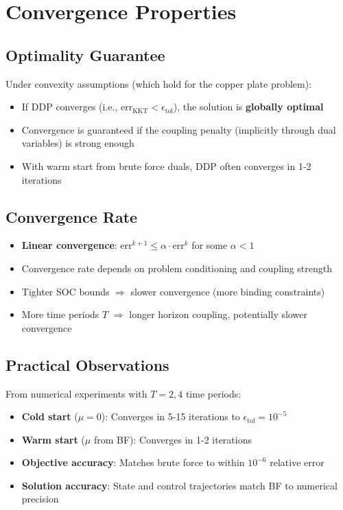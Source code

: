 \documentclass[11pt]{article}
\begin{document}
\section{Convergence Properties}

\subsection{Optimality Guarantee}
Under convexity assumptions (which hold for the copper plate problem):
\begin{itemize}
    \item If DDP converges (i.e., $\text{err}_{\text{KKT}} < \epsilon_{\text{tol}}$), the solution is \textbf{globally optimal}
    \item Convergence is guaranteed if the coupling penalty (implicitly through dual variables) is strong enough
    \item With warm start from brute force duals, DDP often converges in 1-2 iterations
\end{itemize}

\subsection{Convergence Rate}
\begin{itemize}
    \item \textbf{Linear convergence}: $\text{err}^{k+1} \leq \alpha \cdot \text{err}^k$ for some $\alpha < 1$
    \item Convergence rate depends on problem conditioning and coupling strength
    \item Tighter SOC bounds $\Rightarrow$ slower convergence (more binding constraints)
    \item More time periods $T$ $\Rightarrow$ longer horizon coupling, potentially slower convergence
\end{itemize}

\subsection{Practical Observations}
From numerical experiments with $T = 2, 4$ time periods:
\begin{itemize}
    \item \textbf{Cold start} ($\mu = 0$): Converges in 5-15 iterations to $\epsilon_{\text{tol}} = 10^{-5}$
    \item \textbf{Warm start} ($\mu$ from BF): Converges in 1-2 iterations
    \item \textbf{Objective accuracy}: Matches brute force to within $10^{-6}$ relative error
    \item \textbf{Solution accuracy}: State and control trajectories match BF to numerical precision
\end{itemize}
\end{document}
